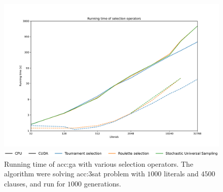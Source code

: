 
\begin{figure}[ht!]
    \centering
    \begin{minipage}[t]{0.9\textwidth}
        \includegraphics[width=\textwidth]{img/runs/time_ga_selections.pdf}
    \end{minipage}

    \begin{minipage}[t]{0.9\textwidth}
        \includegraphics[width=\textwidth]{img/runs/time_ga_selections_legend.pdf}
    \end{minipage}

    \caption[Running time of selection operators]{Running time of \acrlong{acc:ga} with various selection operators. The algorithm were solving \acrshort{acc:3sat} problem with $1000$ literals and $4500$ clauses, and run for $1000$ generations.}
\end{figure}




